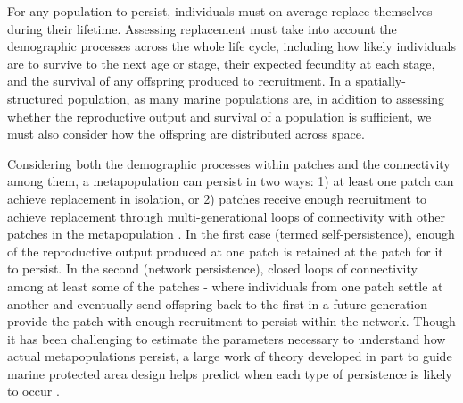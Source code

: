 \documentclass[12pt, oneside]{article}   	%
\begin{document}
For any population to persist, individuals must on average replace themselves during their lifetime. Assessing replacement must take into account the demographic processes across the whole life cycle, including how likely individuals are to survive to the next age or stage, their expected fecundity at each stage, and the survival of any offspring produced to recruitment. In a spatially-structured population, as many marine populations are, in addition to assessing whether the reproductive output and survival of a population is sufficient, we must also consider how the offspring are distributed across space. %

Considering both the demographic processes within patches and the connectivity among them, a metapopulation can persist in two ways: 1) at least one patch can achieve replacement in isolation, or 2) patches receive enough recruitment to achieve replacement through multi-generational loops of connectivity with other patches in the metapopulation \citep{hastings_persistence_2006, burgess2014beyond}. In the first case (termed self-persistence), enough of the reproductive output produced at one patch is retained at the patch for it to persist. In the second (network persistence), closed loops of connectivity among at least some of the patches - where individuals from one patch settle at another and eventually send offspring back to the first in a future generation - provide the patch with enough recruitment to persist within the network. Though it has been challenging to estimate the parameters necessary to understand how actual metapopulations persist, a large work of theory developed in part to guide marine protected area design helps predict when each type of persistence is likely to occur \citep[i.e., large patches relative to the mean dispersal distance are likely to be self-persistent,][]{botsford_dependence_2001}. %
\end{document}
